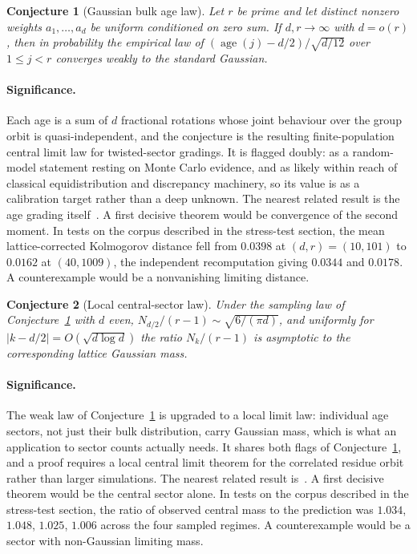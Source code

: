 \documentclass[11pt]{article}
\newtheorem{conjecture}{Conjecture}
\theoremstyle{definition}
\begin{document}
\begin{conjecture}[Gaussian bulk age law]\label{y10}
Let $r$ be prime and let distinct nonzero weights $a_1,\ldots,a_d$ be uniform conditioned on zero sum.  If $d,r\to\infty$ with $d=o(r)$, then in probability the empirical law of $(\operatorname{age}(j)-d/2)/\sqrt{d/12}$ over $1\le j<r$ converges weakly to the standard Gaussian.
\end{conjecture}

\paragraph{Significance.}
Each age is a sum of $d$ fractional rotations whose joint behaviour over the group orbit is quasi-independent, and the conjecture is the resulting finite-population central limit law for twisted-sector gradings.  It is flagged doubly: as a random-model statement resting on Monte Carlo evidence, and as likely within reach of classical equidistribution and discrepancy machinery, so its value is as a calibration target rather than a deep unknown.  The nearest related result is the age grading itself~\cite{Reid02}.  A first decisive theorem would be convergence of the second moment.  In tests on the corpus described in the stress-test section, the mean lattice-corrected Kolmogorov distance fell from $0.0398$ at $(d,r)=(10,101)$ to $0.0162$ at $(40,1009)$, the independent recomputation giving $0.0344$ and $0.0178$.  A counterexample would be a nonvanishing limiting distance.

\begin{conjecture}[Local central-sector law]\label{y11}
Under the sampling law of Conjecture~\ref{y10} with $d$ even, $N_{d/2}/(r-1)\sim\sqrt{6/(\pi d)}$, and uniformly for $|k-d/2|=O(\sqrt{d\log d})$ the ratio $N_k/(r-1)$ is asymptotic to the corresponding lattice Gaussian mass.
\end{conjecture}

\paragraph{Significance.}
The weak law of Conjecture~\ref{y10} is upgraded to a local limit law: individual age sectors, not just their bulk distribution, carry Gaussian mass, which is what an application to sector counts actually needs.  It shares both flags of Conjecture~\ref{y10}, and a proof requires a local central limit theorem for the correlated residue orbit rather than larger simulations.  The nearest related result is~\cite{Reid02}.  A first decisive theorem would be the central sector alone.  In tests on the corpus described in the stress-test section, the ratio of observed central mass to the prediction was $1.034$, $1.048$, $1.025$, $1.006$ across the four sampled regimes.  A counterexample would be a sector with non-Gaussian limiting mass.
\end{document}
